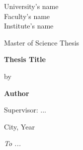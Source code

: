 

\pagestyle{empty}
\sffamily

\noindent
\begin{center}
    \Large
    University's name\\
    Faculty's name\\
    Institute's name
\end{center}

\vfill\vfill
\begin{center}
    \large
    Master of Science Thesis\\
\end{center}

\vfill
\begin{center}
    \Huge\bfseries
    Thesis Title
\end{center}

\vfill
\begin{center}
    \Large
    by
\end{center}

\vfill
\begin{center}
    \huge\bfseries
    Author
\end{center}

\vfill\vfill\vfill
\begin{center}
    \Large
    Supervisor: ...
\end{center}

\vfill
\begin{center}
\large
    City, Year
\end{center}

\cleardoublepage

\vspace*{\fill}
{\hfill\sffamily\itshape To ...}
\cleardoublepage

\rmfamily
\normalfont

\pagestyle{headings}
\tableofcontents


